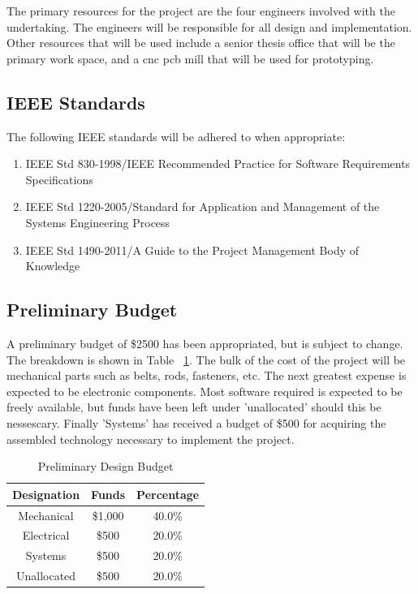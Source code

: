 \documentclass[11pt]{report}
\begin{document}
The primary resources for the project are the four engineers involved with the undertaking.
The engineers will be responsible for all design and implementation.
Other resources that will be used include a senior thesis office that will be the primary work space, and a \gls{cnc} \gls{pcb} mill that will be used for prototyping.

\subsection{IEEE Standards}
The following IEEE standards will be adhered to when appropriate:
\begin{enumerate} \parskip2pt
	\item IEEE Std 830-1998/IEEE Recommended Practice for Software Requirements Specifications
	\item IEEE Std 1220-2005/Standard for Application and Management of the Systems Engineering Process
	\item IEEE Std 1490-2011/A Guide to the Project Management Body of Knowledge
\end{enumerate}

\subsection{Preliminary Budget}
A preliminary budget of \$2500 has been appropriated, but is subject to change.
The breakdown is shown in Table ~\ref{table:budget}.
The bulk of the cost of the project will be mechanical parts such as belts, rods, fasteners, etc.
The next greatest expense is expected to be electronic components.
Most software required is expected to be freely available, but funds have been left under 'unallocated' should this be nessescary.
Finally 'Systems' has received a budget of \$500 for acquiring the assembled technology necessary to implement the project. 

\begin{table}[ht] 
	\centering 
	\begin{tabular}{c c c} 
		Designation	& Funds 		& Percentage\\
		\hline
		Mechanical	& \$1,000 	& 40.0\% \\ 
		Electrical	& \$500 		& 20.0\% \\ 
		Systems		& \$500 		& 20.0\% \\ 
		Unallocated	& \$500 		& 20.0\% \\
	\end{tabular} 
	\caption{Preliminary Design Budget}
	\label{table:budget}
\end{table}
\end{document}
